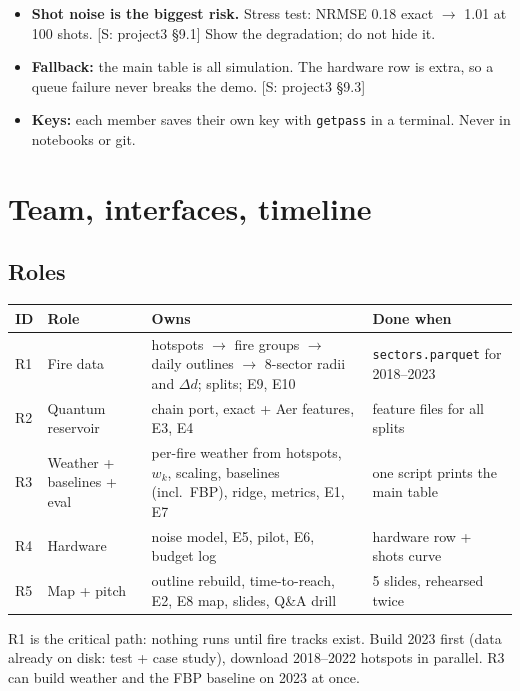 \documentclass[11pt,a4paper]{article}
\newcommand{\tagbox}[2]{{\footnotesize\color{#1}\textsf{[#2]}}}
\newcommand{\supp}[1]{\tagbox{ForestGreen!70!black}{S: #1}}  %
\newcommand{\code}[1]{\texttt{\small #1}}
\begin{document}
\begin{watch}
\begin{itemize}
\item \textbf{Shot noise is the biggest risk.} Stress test: NRMSE 0.18 exact $\to$ 1.01 at 100 shots.
  \supp{project3 \S9.1} Show the degradation; do not hide it.
\item \textbf{Fallback:} the main table is all simulation. The hardware row is extra, so a queue failure never breaks
  the demo. \supp{project3 \S9.3}
\item \textbf{Keys:} each member saves their own key with \code{getpass} in a terminal. Never in notebooks or git.
\end{itemize}
\end{watch}

\section{Team, interfaces, timeline}

\subsection{Roles}
\begin{center}\small
\begin{tabularx}{\linewidth}{@{}l l Y Y@{}}
\toprule
\textbf{ID} & \textbf{Role} & \textbf{Owns} & \textbf{Done when}\\
\midrule
R1 & Fire data & hotspots $\to$ fire groups $\to$ daily outlines $\to$ 8-sector radii and $\Delta d$; splits; E9, E10 &
\code{sectors.parquet} for 2018--2023\\
R2 & Quantum reservoir & chain port, exact + Aer features, E3, E4 & feature files for all splits\\
R3 & Weather + baselines + eval & per-fire weather from hotspots, $w_k$, scaling, baselines (incl.\ FBP), ridge,
metrics, E1, E7 & one script prints the main table\\
R4 & Hardware & noise model, E5, pilot, E6, budget log & hardware row + shots curve\\
R5 & Map + pitch & outline rebuild, time-to-reach, E2, E8 map, slides, Q\&A drill & 5 slides, rehearsed twice\\
\bottomrule
\end{tabularx}
\end{center}

\begin{watch}
R1 is the critical path: nothing runs until fire tracks exist. Build 2023 first (data already on disk: test + case
study), download 2018--2022 hotspots in parallel. R3 can build weather and the FBP baseline on 2023 at once.
\end{watch}
\end{document}
